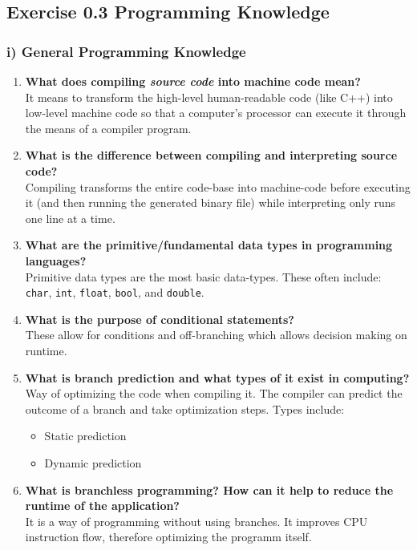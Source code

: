 \documentclass[a4paper]{article}
\begin{document}
\setcounter{section}{0}
\subsection*{Exercise 0.3 Programming Knowledge}
\subsubsection{i) General Programming Knowledge}
\begin{enumerate}
    \item \textbf{What does compiling \textit{source code} into machine code mean?}\\
    It means to transform the high-level human-readable code (like C++) into low-level machine code so that a computer's processor can execute it through the means of a compiler program.

    \item \textbf{What is the difference between compiling and interpreting source code?}\\
    Compiling transforms the entire code-base into machine-code before executing it (and then running the generated binary file) while interpreting only runs one line at a time.

    \item \textbf{What are the primitive/fundamental data types in programming languages?}\\
    Primitive data types are the most basic data-types. These often include: \texttt{char}, \texttt{int}, \texttt{float}, \texttt{bool}, and \texttt{double}.

    \item \textbf{What is the purpose of conditional statements?}\\
    These allow for conditions and off-branching which allows decision making on runtime.

    \item \textbf{What is branch prediction and what types of it exist in computing?}\\
    Way of optimizing the code when compiling it. The compiler can predict the outcome of a branch and take optimization steps.
    Types include:
    \begin{itemize}
        \item Static prediction
        \item Dynamic prediction
    \end{itemize}

    \item \textbf{What is branchless programming? How can it help to reduce the runtime of the application?}\\
    It is a way of programming without using branches. It improves CPU instruction flow, therefore optimizing the programm itself.


\end{enumerate}
\end{document}
